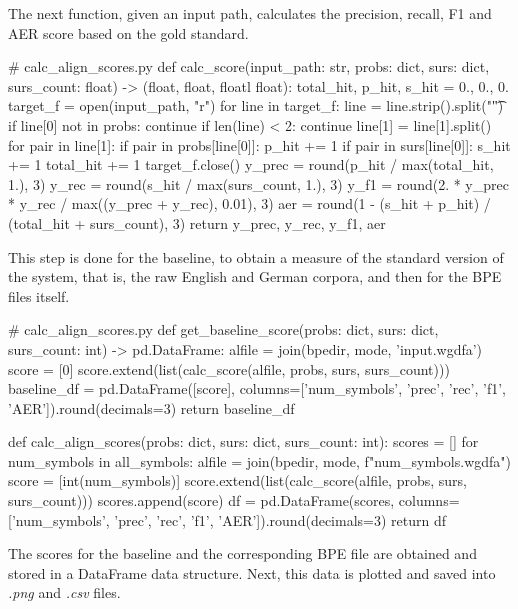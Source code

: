 The next function, given an input path, calculates the precision, recall, F1 and AER score based on the gold standard.

\begin{python}
# calc_align_scores.py
def calc_score(input_path: str, probs: dict, surs: dict, surs_count: float) -> (float, float, floatl float):
  total_hit, p_hit, s_hit = 0., 0., 0.
  target_f = open(input_path, "r")
  for line in target_f:
    line = line.strip().split("\t")
    if line[0] not in probs: continue
    if len(line) < 2: continue
    line[1] = line[1].split()
    for pair in line[1]:
      if pair in probs[line[0]]:
        p_hit += 1
      if pair in surs[line[0]]:
        s_hit += 1
      total_hit += 1
  target_f.close()
  y_prec = round(p_hit / max(total_hit, 1.), 3)
  y_rec = round(s_hit / max(surs_count, 1.), 3)
  y_f1 = round(2. * y_prec * y_rec / max((y_prec + y_rec), 0.01), 3)
  aer = round(1 - (s_hit + p_hit) / (total_hit + surs_count), 3)
  return y_prec, y_rec, y_f1, aer
\end{python}

This step is done for the baseline, to obtain a measure of the standard version of the system, that is, the raw English and German corpora, and then for the BPE files itself.

\clearpage
\begin{python}
# calc_align_scores.py
def get_baseline_score(probs: dict, surs: dict, surs_count: int) -> pd.DataFrame:
  alfile = join(bpedir, mode, 'input.wgdfa')
  score = [0]
  score.extend(list(calc_score(alfile, probs, surs, surs_count)))
  baseline_df = pd.DataFrame([score], columns=['num_symbols', 'prec', 'rec', 'f1', 'AER']).round(decimals=3)
  return baseline_df

def calc_align_scores(probs: dict, surs: dict, surs_count: int):
  scores = []
  for num_symbols in all_symbols:
    alfile = join(bpedir, mode, f"{num_symbols}.wgdfa")
    score = [int(num_symbols)]
    score.extend(list(calc_score(alfile, probs, surs, surs_count)))
    scores.append(score)
  df = pd.DataFrame(scores, columns=['num_symbols', 'prec', 'rec', 'f1', 'AER']).round(decimals=3)
  return df
\end{python}

The scores for the baseline and the corresponding BPE file are obtained and stored in a DataFrame data structure. Next, this data is plotted and saved into \emph{.png} and \emph{.csv} files.

